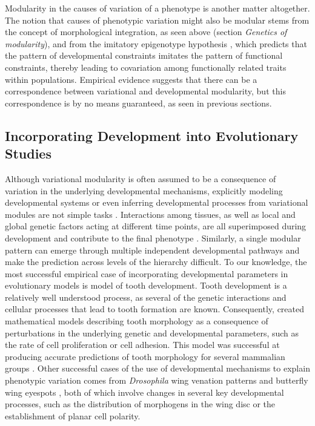 \begin{refsection}
Modularity in the causes of variation of a phenotype is another matter
altogether. The notion that causes of phenotypic variation might also be
modular stems from the concept of morphological integration, as seen
above (section \emph{Genetics of modularity}), and from the imitatory
epigenotype hypothesis \parencite{Riedl1978-ub},
which predicts that the pattern of developmental constraints imitates
the pattern of functional constraints, thereby leading to covariation
among functionally related traits within populations. Empirical evidence
suggests that there can be a correspondence between variational and
developmental modularity, but this correspondence is by no means
guaranteed, as seen in previous sections.

\subsection{Incorporating Development into Evolutionary Studies}

Although variational modularity is often assumed to be a consequence of
variation in the underlying developmental mechanisms, explicitly
modeling developmental systems or even inferring developmental processes
from variational modules are not simple tasks \parencite{Hallgrimsson2009-kq, Pavlicev2015-up}.
Interactions among tissues, as well as local and global genetic factors
acting at different time points, are all superimposed during development
and contribute to the final phenotype \parencite{Hallgrimsson2009-kq, Mitteroecker2007-xq}.
Similarly, a single modular pattern can emerge through multiple
independent developmental pathways \parencite{Mitteroecker2009-jb}
 and make the
prediction across levels of the hierarchy difficult. To our knowledge,
the most successful empirical case of incorporating developmental
parameters in evolutionary models is \textcite{Salazar-Ciudad2002-yf, Salazar-Ciudad2010-wc}
 model of tooth development.
Tooth development is a relatively well understood process, as several of
the genetic interactions and cellular processes that lead to tooth
formation are known. Consequently,
\textcite{Salazar-Ciudad2010-wc}
created mathematical models describing tooth morphology as a consequence
of perturbations in the underlying genetic and developmental parameters,
such as the rate of cell proliferation or cell adhesion. This model was
successful at producing accurate predictions of tooth morphology for
several mammalian groups
\parencite{Salazar-Ciudad2010-wc}.
Other successful cases of the use of developmental mechanisms to explain
phenotypic variation comes from \emph{Drosophila} wing venation patterns
\parencite{Matamoro-Vidal2015-vd} and
butterfly wing eyespots \parencite{Beldade2002-vf}, both of which involve changes in several key
developmental processes, such as the distribution of morphogens in the
wing disc or the establishment of planar cell polarity.


\end{refsection}
